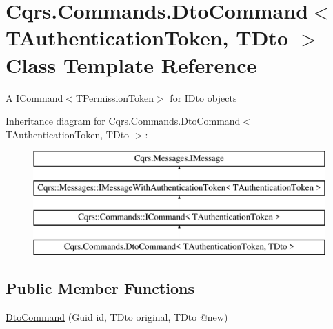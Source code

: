 \hypertarget{classCqrs_1_1Commands_1_1DtoCommand}{}\section{Cqrs.\+Commands.\+Dto\+Command$<$ T\+Authentication\+Token, T\+Dto $>$ Class Template Reference}
\label{classCqrs_1_1Commands_1_1DtoCommand}


A I\+Command$<$\+T\+Permission\+Token$>$ for I\+Dto objects  


Inheritance diagram for Cqrs.\+Commands.\+Dto\+Command$<$ T\+Authentication\+Token, T\+Dto $>$\+:\begin{figure}[H]
\begin{center}
\leavevmode
\includegraphics[height=4.000000cm]{classCqrs_1_1Commands_1_1DtoCommand}
\end{center}
\end{figure}
\subsection*{Public Member Functions}
\begin{DoxyCompactItemize}
\item 
\hyperlink{classCqrs_1_1Commands_1_1DtoCommand_a705b7bdee6a242dd56821c60b4040b23_a705b7bdee6a242dd56821c60b4040b23}{Dto\+Command} (Guid id, T\+Dto original, T\+Dto @new)
\end{DoxyCompactItemize}
